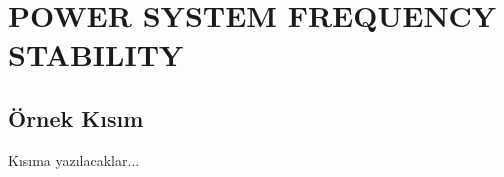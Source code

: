 \chapter{POWER SYSTEM FREQUENCY STABILITY}
\label{chp:2}

\section{Örnek Kısım}


Kısıma yazılacaklar...

